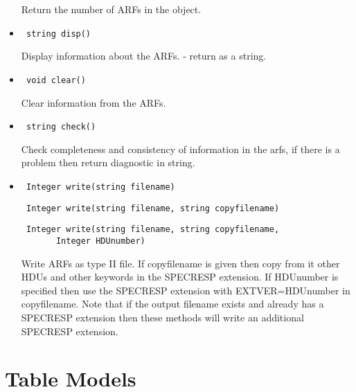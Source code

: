 \documentclass[11pt]{book}
\begin{document}
\begin{itemize}
           Return the number of ARFs in the object.

\item    \begin{verbatim} string disp() \end{verbatim}

           Display information about the ARFs. - return as a string.

\item    \begin{verbatim} void clear() \end{verbatim}

           Clear information from the ARFs.

\item    \begin{verbatim} string check() \end{verbatim}

           Check completeness and consistency of information in the arfs,
           if there is a problem then return diagnostic in string.

\item  \begin{verbatim} Integer write(string filename) \end{verbatim}
       \begin{verbatim} Integer write(string filename, string copyfilename) \end{verbatim}
       \begin{verbatim} Integer write(string filename, string copyfilename,
       Integer HDUnumber) \end{verbatim}

          Write ARFs as type II file. If copyfilename is given then
          copy from it other HDUs and other keywords in the SPECRESP
          extension. If HDUnumber is specified then use the SPECRESP
          extension with EXTVER=HDUnumber in copyfilename. Note that 
          if the output filename exists and already has a SPECRESP 
          extension then these methods will write an additional 
          SPECRESP extension.


%
%

\end{itemize}


\section{Table Models}
\end{document}
